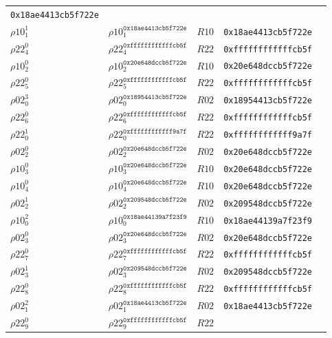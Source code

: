 \begin{longtable}[c]{|l|l|l|l|l|}
  \texttt{0x18ae4413cb5f722e} \\
  $\rho10_{1}^{1}$ & $\rho10_{1}^{\texttt{0x18ae4413cb5f722e}}$ & $R10$ &
  \texttt{0x18ae4413cb5f722e} \\
  $\rho22_{4}^{0}$ & $\rho22_{4}^{\texttt{0xffffffffffffcb5f}}$ & $R22$ &
  \texttt{0xffffffffffffcb5f} \\
  $\rho10_{2}^{0}$ & $\rho10_{2}^{\texttt{0x20e648dccb5f722e}}$ & $R10$ &
  \texttt{0x20e648dccb5f722e} \\
  $\rho22_{5}^{0}$ & $\rho22_{5}^{\texttt{0xffffffffffffcb5f}}$ & $R22$ &
  \texttt{0xffffffffffffcb5f} \\
  $\rho02_{0}^{3}$ & $\rho02_{0}^{\texttt{0x18954413cb5f722e}}$ & $R02$ &
  \texttt{0x18954413cb5f722e} \\
  $\rho22_{6}^{0}$ & $\rho22_{6}^{\texttt{0xffffffffffffcb5f}}$ & $R22$ &
  \texttt{0xffffffffffffcb5f} \\
  $\rho22_{0}^{1}$ & $\rho22_{0}^{\texttt{0xffffffffffff9a7f}}$ & $R22$ &
  \texttt{0xffffffffffff9a7f} \\
  $\rho02_{2}^{0}$ & $\rho02_{2}^{\texttt{0x20e648dccb5f722e}}$ & $R02$ &
  \texttt{0x20e648dccb5f722e} \\
  $\rho10_{3}^{0}$ & $\rho10_{3}^{\texttt{0x20e648dccb5f722e}}$ & $R10$ &
  \texttt{0x20e648dccb5f722e} \\
  $\rho10_{4}^{0}$ & $\rho10_{4}^{\texttt{0x20e648dccb5f722e}}$ & $R10$ &
  \texttt{0x20e648dccb5f722e} \\
  $\rho02_{2}^{1}$ & $\rho02_{2}^{\texttt{0x209548dccb5f722e}}$ & $R02$ &
  \texttt{0x209548dccb5f722e} \\
  $\rho10_{0}^{2}$ & $\rho10_{0}^{\texttt{0x18ae44139a7f23f9}}$ & $R10$ &
  \texttt{0x18ae44139a7f23f9} \\
  $\rho02_{3}^{0}$ & $\rho02_{3}^{\texttt{0x20e648dccb5f722e}}$ & $R02$ &
  \texttt{0x20e648dccb5f722e} \\
  $\rho22_{7}^{0}$ & $\rho22_{7}^{\texttt{0xffffffffffffcb5f}}$ & $R22$ &
  \texttt{0xffffffffffffcb5f} \\
  $\rho02_{3}^{1}$ & $\rho02_{3}^{\texttt{0x209548dccb5f722e}}$ & $R02$ &
  \texttt{0x209548dccb5f722e} \\
  $\rho22_{8}^{0}$ & $\rho22_{8}^{\texttt{0xffffffffffffcb5f}}$ & $R22$ &
  \texttt{0xffffffffffffcb5f} \\
  $\rho02_{1}^{2}$ & $\rho02_{1}^{\texttt{0x18ae4413cb5f722e}}$ & $R02$ &
  \texttt{0x18ae4413cb5f722e} \\
  $\rho22_{9}^{0}$ & $\rho22_{9}^{\texttt{0xffffffffffffcb5f}}$ & $R22$ &

\end{longtable}
